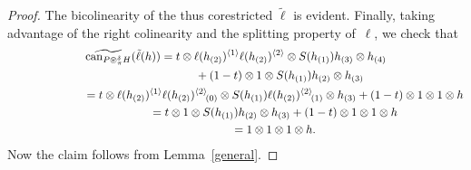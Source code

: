 \begin{proof}
The bicolinearity of the thus corestricted $\tilde\ell$ is evident. Finally, taking
advantage of the right colinearity and the splitting property of~$\ell$, we check that
\begin{gather*}
 \widetilde{\operatorname{can}_{P\circledast^\delta_\pi H}}(\tilde\ell (h)) =
 t \otimes  \ell (h_{(2)})^{\langle 1\rangle}\ell (h_{(2)})^{\langle 2\rangle}
\otimes S(h_{(1)})  h_{(3)}\otimes h_{(4)}\\
\hphantom{\widetilde{\operatorname{can}_{P\circledast^\delta_\pi H}}(\tilde\ell (h)) =}{}
+ (1-t) \otimes 1 \otimes S(h_{(1)})h_{(2)} \otimes h_{(3)}
 \\
\hphantom{\widetilde{\operatorname{can}_{P\circledast^\delta_\pi H}}(\tilde\ell (h))}{} =  t \otimes  \ell (h_{(2)})^{\langle 1\rangle}\ell (h_{(2)})^{\langle 2\rangle}\!{}_{(0)} \otimes S(h_{(1)})
\ell (h_{(2)})^{\langle 2\rangle}\!{}_{(1)}\otimes h_{(3)}
+ (1-t) \otimes 1 \otimes 1 \otimes h
 \\
\hphantom{\widetilde{\operatorname{can}_{P\circledast^\delta_\pi H}}(\tilde\ell (h))}{} =  t \otimes  1 \otimes S(h_{(1)})  h_{(2)}\otimes h_{(3)}
+ (1-t) \otimes 1 \otimes 1 \otimes h
 \\
\hphantom{\widetilde{\operatorname{can}_{P\circledast^\delta_\pi H}}(\tilde\ell (h))}{}
 =  1 \otimes  1 \otimes 1 \otimes h.
\end{gather*}
Now the claim follows from Lemma~\ref{general}.
\end{proof}
